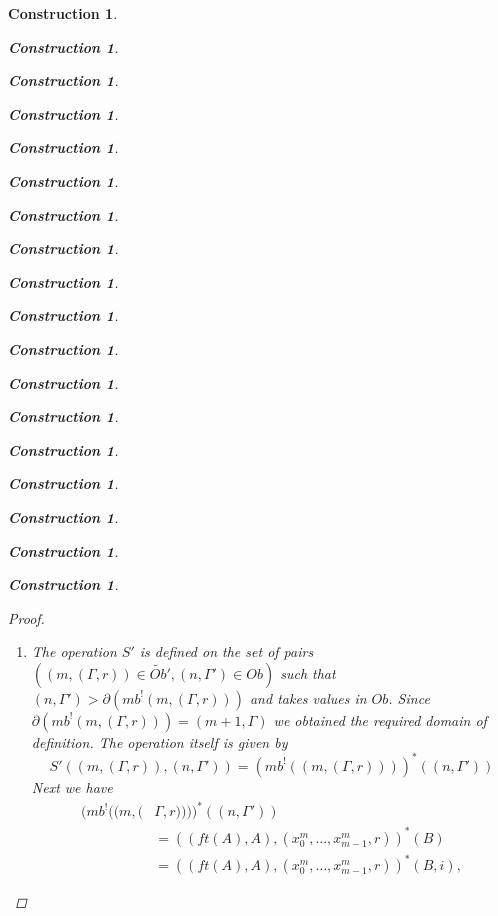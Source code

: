 \documentclass[onecolumn,12pt]{amsart}
\numberwithin{proposition}{subsection}
\newtheorem{construction}[proposition]{Construction}
\newcommand{\wt}{\widetilde}
\begin{document}
\begin{construction}
\begin{construction}
\begin{construction}
\begin{construction}
\begin{construction}
\begin{construction}
\begin{construction}
\begin{construction}
\begin{construction}
\begin{construction}
\begin{construction}
\begin{construction}
\begin{construction}
\begin{construction}
\begin{construction}
\begin{construction}
\begin{construction}
\begin{construction}
\begin{proof}
\begin{enumerate}
To verify the formula for the operation itself consider the equalities:
%
\begin{equation*}
  \begin{split}
    \wt{T}'((&m,\Gamma),(n,(\Gamma',s)))=mb(p_{(m,\Gamma)}^*(mb^!(n,(\Gamma',s))))\\&=
    mb(p_{(m,\Gamma)}^*((ft((n+1,\Gamma')),((n+1,\Gamma'),(x^{n}_0,\dots,x^{n}_{n-1},s))))),
  \end{split}
\end{equation*}
%
where the first equality is by Definition \ref{2015.08.26.def1}(2). By Lemma
\ref{2015.09.03.l1} we can extend these equalities as follows:
\begin{equation*}
  \begin{split}
    mb(&p_{(m,\Gamma)}^*((ft((n+1,\Gamma')),((n+1,\Gamma'),(x^{n}_0,\dots,x^{n}_{n-1},s)))))\\&=
       mb(p_{X}^*(ft(Y)),(p_{X}^*(Y),(x^{n+1}_0,\dots,x^{n+1}_{n},(qq^{n-m+1}(\iota^1_{m-1}))(s))))\\&=
       (n+1,(p_{X}^*(Y),\partial_{n}^{m-1}(s)))\\&=
       (n+1,(T((m,\Gamma),(n+1,\Gamma')),\partial_n^{m-1}(s))),
  \end{split}
\end{equation*}
where $X=(m,\Gamma)$, $Y=(n+1,\Gamma')$, the first equality is by Lemma
\ref{2015.09.03.l1}, the second by Lemma \ref{2015.08.26.l3a} and the third by
Definition \ref{2015.08.26.def1}(1).
%
\item The operation $S'$ is defined on the set of pairs $((m,(\Gamma,r))\in
  \wt{Ob}',(n,\Gamma')\in Ob)$ such that
  $(n,\Gamma')>\partial(mb^!(m,(\Gamma,r)))$ and takes values in $Ob$. Since
  $\partial(mb^!(m,(\Gamma,r)))=(m+1,\Gamma)$ we obtained the required domain
  of definition. The operation itself is given by
%
\begin{equation}\label{2016.01.21.eq2}
S'((m,(\Gamma,r)),(n,\Gamma'))=(mb^!((m,(\Gamma,r))))^*((n,\Gamma'))
\end{equation}%
%
Next we have 
%
\begin{equation*}
  \begin{split}
    (mb^!((m,(&\Gamma,r))))^*((n,\Gamma'))
    \\&=
    ((ft(A),A),(x^{m}_0,\dots,x^{m}_{m-1},r))^*(B)
    \\&=
    ((ft(A),A),(x^{m}_0,\dots,x^{m}_{m-1},r))^*(B,i),
  \end{split}
\end{equation*}

\end{enumerate}
\end{proof}
\end{construction}
\end{construction}
\end{construction}
\end{construction}
\end{construction}
\end{construction}
\end{construction}
\end{construction}
\end{construction}
\end{construction}
\end{construction}
\end{construction}
\end{construction}
\end{construction}
\end{construction}
\end{construction}
\end{construction}
\end{construction}
\end{document}

